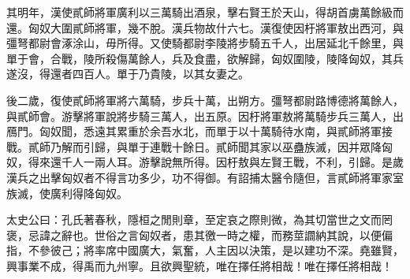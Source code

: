 \begin{pinyinscope}
其明年，漢使貳師將軍廣利以三萬騎出酒泉，擊右賢王於天山，得胡首虜萬餘級而還。匈奴大圍貳師將軍，幾不脫。漢兵物故什六七。漢復使因杅將軍敖出西河，與彊弩都尉會涿涂山，毋所得。又使騎都尉李陵將步騎五千人，出居延北千餘里，與單于會，合戰，陵所殺傷萬餘人，兵及食盡，欲解歸，匈奴圍陵，陵降匈奴，其兵遂沒，得還者四百人。單于乃貴陵，以其女妻之。

後二歲，復使貳師將軍將六萬騎，步兵十萬，出朔方。彊弩都尉路博德將萬餘人，與貳師會。游擊將軍說將步騎三萬人，出五原。因杅將軍敖將萬騎步兵三萬人，出鴈門。匈奴聞，悉遠其累重於余吾水北，而單于以十萬騎待水南，與貳師將軍接戰。貳師乃解而引歸，與單于連戰十餘日。貳師聞其家以巫蠱族滅，因并眾降匈奴，得來還千人一兩人耳。游擊說無所得。因杅敖與左賢王戰，不利，引歸。是歲漢兵之出擊匈奴者不得言功多少，功不得御。有詔捕太醫令隨但，言貳師將軍家室族滅，使廣利得降匈奴。

太史公曰：孔氏著春秋，隱桓之閒則章，至定哀之際則微，為其切當世之文而罔褒，忌諱之辭也。世俗之言匈奴者，患其徼一時之權，而務莖讇納其說，以便偏指，不參彼己；將率席中國廣大，氣奮，人主因以決策，是以建功不深。堯雖賢，興事業不成，得禹而九州寧。且欲興聖統，唯在擇任將相哉！唯在擇任將相哉！


\end{pinyinscope}